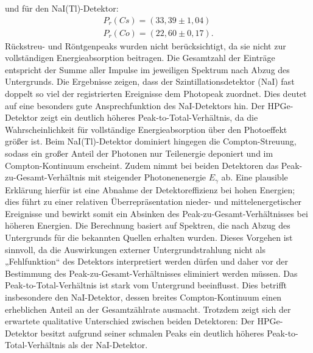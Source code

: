 und für den NaI(Tl)-Detektor: 
\begin{align*}
    P_r(Cs) = (33,39 \pm 1,04)\\
    P_r(Co) = (22,60 \pm 0,17).
\end{align*}
Rückstreu- und Röntgenpeaks wurden nicht berücksichtigt, da sie nicht zur vollständigen Energieabsorption beitragen. Die Gesamtzahl der Einträge entspricht der Summe aller Impulse im jeweiligen Spektrum nach Abzug des Untergrunds.
Die Ergebnisse zeigen, dass der Szintillationsdetektor (NaI) fast doppelt so viel der registrierten Ereignisse dem Photopeak zuordnet. Dies deutet auf eine besonders gute Ansprechfunktion des NaI-Detektors hin. Der HPGe-Detektor zeigt ein deutlich höheres Peak-to-Total-Verhältnis, da die Wahrscheinlichkeit für vollständige Energieabsorption über den Photoeffekt größer ist. Beim NaI(Tl)-Detektor dominiert hingegen die Compton-Streuung, sodass ein großer Anteil der Photonen nur Teilenergie
deponiert und im Compton-Kontinuum erscheint. 
 Zudem nimmt bei beiden Detektoren das Peak-zu-Gesamt-Verhältnis mit steigender Photonenenergie \(E_\gamma\) ab. Eine plausible Erklärung hierfür ist eine Abnahme der Detektoreffizienz bei hohen Energien; dies führt zu einer relativen Überrepräsentation nieder- und mittelenergetischer Ereignisse und bewirkt somit ein Absinken des Peak-zu-Gesamt-Verhältnisses bei höheren Energien. Die Berechnung basiert auf Spektren, die nach Abzug des Untergrunds für die bekannten Quellen erhalten wurden. Dieses Vorgehen ist sinnvoll, da die Auswirkungen externer Untergrundstrahlung nicht als „Fehlfunktion“ des Detektors interpretiert werden dürfen und daher vor der Bestimmung des Peak-zu-Gesamt-Verhältnisses eliminiert werden müssen.
Das Peak-to-Total-Verhältnis ist stark vom Untergrund beeinflusst. 
Dies betrifft insbesondere den NaI-Detektor, dessen breites Compton-Kontinuum einen erheblichen Anteil an der Gesamtzählrate ausmacht.
Trotzdem zeigt sich der erwartete qualitative Unterschied zwischen beiden Detektoren: Der HPGe-Detektor besitzt aufgrund seiner schmalen Peaks ein deutlich höheres Peak-to-Total-Verhältnis als der NaI-Detektor.